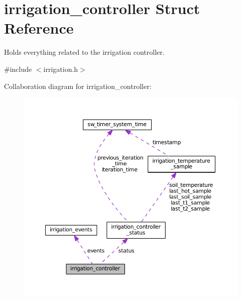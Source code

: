 \hypertarget{structirrigation__controller}{}\section{irrigation\+\_\+controller Struct Reference}
\label{structirrigation__controller}


Holds everything related to the irrigation controller.  




{\ttfamily \#include $<$irrigation.\+h$>$}



Collaboration diagram for irrigation\+\_\+controller\+:\nopagebreak
\begin{figure}[H]
\begin{center}
\leavevmode
\includegraphics[width=350pt]{structirrigation__controller__coll__graph}
\end{center}
\end{figure}
